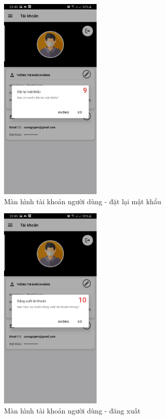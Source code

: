 \documentclass[12pt]{article}
\begin{document}
\begin{figure}[H]
    \centering
    \includegraphics[height=10cm]{images/40.png}
    \caption{Màn hình tài khoản người dùng - đặt lại mật khẩu}
\end{figure}

\begin{figure}[H]
    \centering
    \includegraphics[height=10cm]{images/41.png}
    \caption{Màn hình tài khoản người dùng - đăng xuất}
\end{figure}
\end{document}
